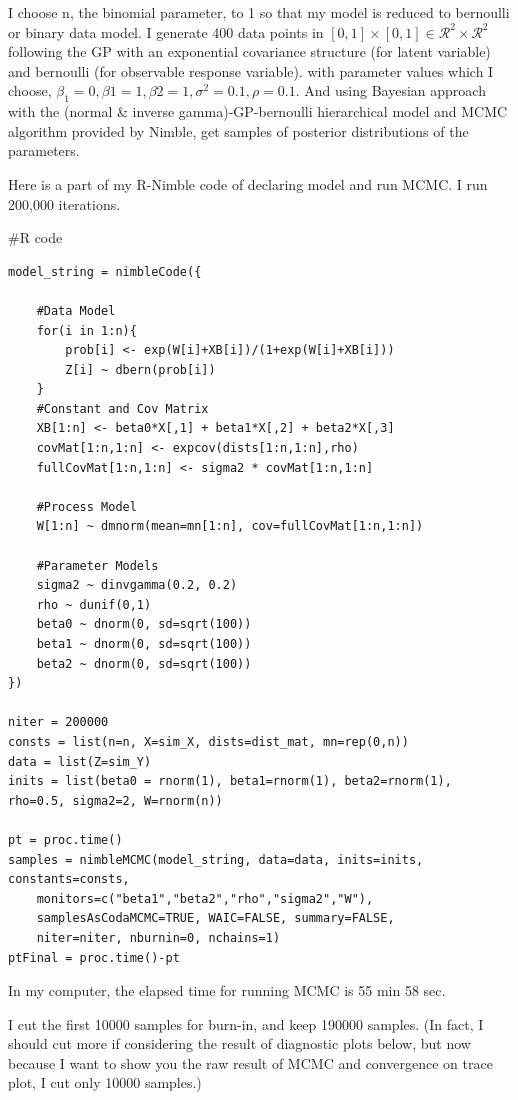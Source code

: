\documentclass{article}
\newenvironment{Rcode}%
{%
    \begin{mdframed}
    \#R code
    \begin{small}
}
{%
    \end{small}
    \end{mdframed}
}
\begin{document}
I choose n, the binomial parameter, to 1 so that my model is reduced to bernoulli or binary data model.
I generate 400 data points in $[0,1]\times[0,1] \in \mathcal{R}^2\times\mathcal{R}^2$
following the GP with an exponential covariance structure (for latent variable) and bernoulli (for observable response variable).
with parameter values which I choose, $\beta_1=0, \beta1=1, \beta2=1, \sigma^2=0.1, \rho=0.1$.
And using Bayesian approach with the (normal \& inverse gamma)-GP-bernoulli hierarchical model and
MCMC algorithm provided by Nimble, get samples of posterior distributions of the parameters.

Here is a part of my R-Nimble code of declaring model and run MCMC.
I run 200,000 iterations.
\begin{Rcode}
    \begin{verbatim}
model_string = nimbleCode({

    #Data Model
    for(i in 1:n){
        prob[i] <- exp(W[i]+XB[i])/(1+exp(W[i]+XB[i]))
        Z[i] ~ dbern(prob[i])
    }
    #Constant and Cov Matrix
    XB[1:n] <- beta0*X[,1] + beta1*X[,2] + beta2*X[,3]
    covMat[1:n,1:n] <- expcov(dists[1:n,1:n],rho)
    fullCovMat[1:n,1:n] <- sigma2 * covMat[1:n,1:n]

    #Process Model
    W[1:n] ~ dmnorm(mean=mn[1:n], cov=fullCovMat[1:n,1:n])

    #Parameter Models
    sigma2 ~ dinvgamma(0.2, 0.2)
    rho ~ dunif(0,1)
    beta0 ~ dnorm(0, sd=sqrt(100))
    beta1 ~ dnorm(0, sd=sqrt(100))
    beta2 ~ dnorm(0, sd=sqrt(100))
})

niter = 200000
consts = list(n=n, X=sim_X, dists=dist_mat, mn=rep(0,n))
data = list(Z=sim_Y)
inits = list(beta0 = rnorm(1), beta1=rnorm(1), beta2=rnorm(1), rho=0.5, sigma2=2, W=rnorm(n))

pt = proc.time()
samples = nimbleMCMC(model_string, data=data, inits=inits, constants=consts,
    monitors=c("beta1","beta2","rho","sigma2","W"),
    samplesAsCodaMCMC=TRUE, WAIC=FALSE, summary=FALSE,
    niter=niter, nburnin=0, nchains=1)
ptFinal = proc.time()-pt
    \end{verbatim}
\end{Rcode}
In my computer, the elapsed time for running MCMC is 55 min 58 sec.

I cut the first 10000 samples for burn-in, and keep 190000 samples.
(In fact, I should cut more if considering the result of diagnostic plots below,
but now because I want to show you the raw result of MCMC and convergence on trace plot, 
I cut only 10000 samples.)
\end{document}
